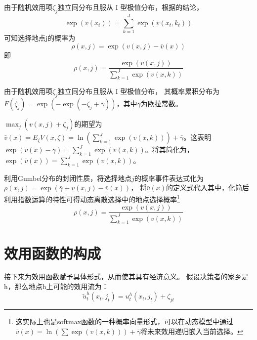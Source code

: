 \documentclass[a4paper,12pt,oneside]{book} %
\begin{document}
\begin{figure}
  
\end{figure}


由于随机效用项$\zeta_j$独立同分布且服从 I 型极值分布，根据\cite{mcfaddenConditionalLogitAnalysis1973,rustOptimalReplacementGMC1987,rustStructuralEstimationMarkov1994}的结论，
\begin{equation}
  \exp(\bar v(x_t))=\sum\limits_{k=1}^{J}\exp(v(x_t,k_t))
\end{equation}
可知选择地点j的概率为
\begin{equation}
  \rho(x,j)=\exp(v(x,j)-\bar v(x))
\end{equation}
即
\begin{equation}
  \rho(x,j)=\frac{\exp(v(x,j))}{\sum\limits_{k=1}^J \exp(v(x,k))}
\end{equation}





由于随机效用项$\zeta_j$独立同分布且服从 I 型极值分布，
其概率累积分布为
$F(\zeta_j)=\exp(-\exp(-\zeta_j+\bar \gamma))$，其中$\bar \gamma$为欧拉常数。

$\max_j \left(v(x,j)+\zeta_j\right)$的期望为$\bar v(x) = E_\zeta V(x,\zeta)= \ln(\sum\limits_{k=1}^J \exp(v(x,k)))+\bar \gamma$。这表明$\exp(\bar v(x)-\bar \gamma)=\sum\limits_{k=1}^J \exp(v(x,k))$。将其简化为，$\exp(\bar v(x))=\sum\limits_{k=1}^J \exp(v(x,k))$。

利用Gumbel分布的封闭性质，将选择地点$j$的概率事件表达式化为$\rho(x,j)=\exp(\bar \gamma + v(x,j) - \bar v(x))$，
将$\bar v(x)$的定义式代入其中，化简后利用指数运算的特性可得动态离散选择中的地点选择概率\footnote{这实际上也是softmax函数的一种概率向量形式，可以在动态模型中通过$\bar v(x) = \ln (\sum \exp(v(x,k)))+\bar \gamma $将未来效用递归嵌入当前选择。}
\begin{equation}
  \rho(x,j)=\frac{\exp(v(x,j))}{\sum\limits_{k=1}^J \exp(v(x,k))}
\end{equation}


\section{效用函数的构成}

接下来为效用函数赋予具体形式，从而使其具有经济意义。
假设决策者的家乡是h，那么地点h上可能的效用流为：
\begin{equation}
  \tilde u_{t}^h(x_t,j_t)=u_{t}^h(x_t,j_t) +\zeta_{jt}
\end{equation}
\end{document}
